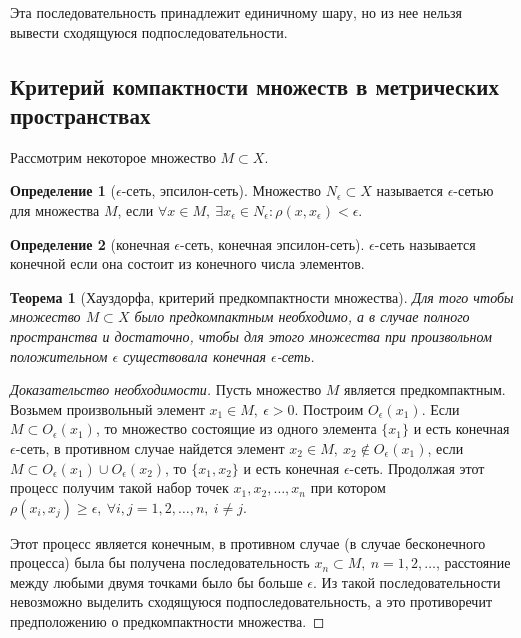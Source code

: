 \documentclass[14pt,a4paper]{extarticle}
\newtheorem{theorem}{Теорема}[section]
\theoremstyle{definition}
\newtheorem{definition}{Определение}[section]
\theoremstyle{remark}
\renewcommand{\[}{\begin{dmath*}[compact]}
\renewcommand{\]}{\end{dmath*}}
\newcommand{\sep}{ , \ \allowbreak }
\begin{document}
Эта последовательность принадлежит единичному шару,
но из нее нельзя вывести сходящуюся подпоследовательности.

\subsection{Критерий компактности множеств в метрических пространствах}

Рассмотрим некоторое множество $M\subset X$.

\begin{definition}[$\epsilon$-сеть, эпсилон-сеть]
  Множество $N_{\epsilon} \subset X$ называется $\epsilon$-сетью для
  множества $M$, если $\forall x \in M \sep \exists x_{\epsilon}
  \in N_{\epsilon}: \rho(x,x_{\epsilon})<\epsilon$.
\end{definition}
\begin{definition}[конечная $\epsilon$-сеть, конечная эпсилон-сеть]
  $\epsilon$-сеть называется конечной если она состоит из
  конечного числа элементов.
\end{definition}

\begin{theorem}[Хауздорфа, критерий предкомпактности множества]
  Для того чтобы множество $M \subset X$ было предкомпактным необходимо,
  а в случае полного пространства и достаточно,
  чтобы для этого множества при произвольном положительном $\epsilon$
  существовала конечная $\epsilon$-сеть.
\end{theorem}

\begin{proof}[Доказательство необходимости]
  Пусть множество $M$ является предкомпактным.
  Возьмем произвольный элемент $x_1 \in M\sep \epsilon > 0$.
  Построим $O_{\epsilon}(x_1)$.
  Если $M \subset O_{\epsilon}(x_1)$,
  то множество состоящие из одного элемента $\{x_1\}$ и есть
  конечная $\epsilon$-сеть, в противном случае найдется элемент
  $x_2 \in M\sep x_2 \not\in O_\epsilon(x_1)$,
  если $M\subset O_\epsilon(x_1)\cup O_\epsilon(x_2)$,
  то $\{x_1,x_2\}$ и есть конечная $\epsilon$-сеть.
  Продолжая этот процесс получим такой набор точек $x_1, x_2,\dots,x_n$
  при котором $\rho(x_i,x_j)\geq \epsilon\sep \forall i,j=1,2,\dots,n \sep
  i \neq j$.

  Этот процесс является конечным, в противном случае
  (в случае бесконечного процесса) была бы получена последовательность
  ${x_n}\subset M\sep n=1,2,\dots$, расстояние между любыми двумя точками
  было бы больше $\epsilon$.
  Из такой последовательности невозможно выделить сходящуюся
  подпоследовательность,
  а это противоречит предположению о предкомпактности множества.
\end{proof}
\end{document}
